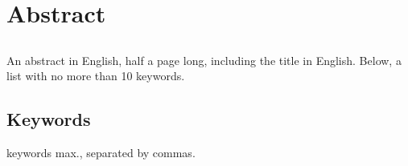 \chapter*{Abstract}


\section*{}

An abstract in English, half a page long, including the title in English. Below, a list with no more than 10 keywords.


\section*{Keywords}

 keywords max., separated by commas.



